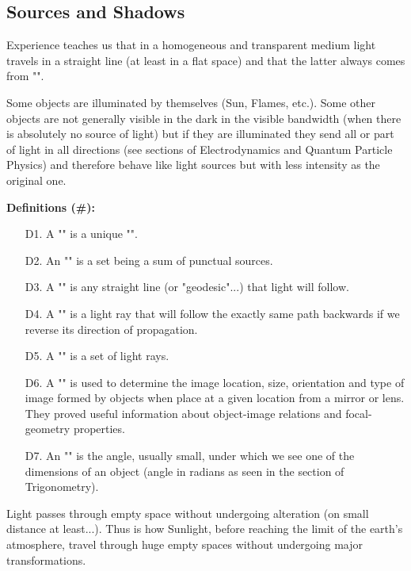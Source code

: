 	\pagebreak
	\subsection{Sources and Shadows}
	Experience teaches us that in a homogeneous and transparent medium light travels in a straight line (at least in a flat space) and that the latter always comes from "".
	
	Some objects are illuminated by themselves (Sun, Flames, etc.). Some other objects are not generally visible in the dark in the visible bandwidth (when there is absolutely no source of light) but if they are illuminated they send all or part of light in all directions (see sections of Electrodynamics and Quantum Particle Physics) and therefore behave like light sources but with less intensity as the original one.
	
	\textbf{Definitions (\#\mydef):}
	\begin{enumerate}
		\item[D1.] A "" is a unique "".
		
		\item[D2.] An "" is a set being a sum of punctual sources.
		
		\item[D3.] A "" is any straight line (or "geodesic"...) that light will follow.
		
		\item[D4.] A "" is a light ray that will follow the exactly same path backwards if we reverse its direction of propagation.
		
		\item[D5.] A "" is a set of light rays.
		
		\item[D6.] A "" is used to determine the image location, size, orientation and type of image formed by objects when place at a given location from a mirror or lens. They proved useful information about object-image relations and focal-geometry properties.
		
		\item[D7.] An "" is the angle, usually small, under which we see  one of the dimensions of an object (angle in radians as seen in the section of Trigonometry).
	\end{enumerate}
	Light passes through empty space without undergoing alteration (on small distance at least...). Thus is how Sunlight, before reaching the limit of the earth's atmosphere, travel through huge empty spaces without undergoing major transformations.
	
